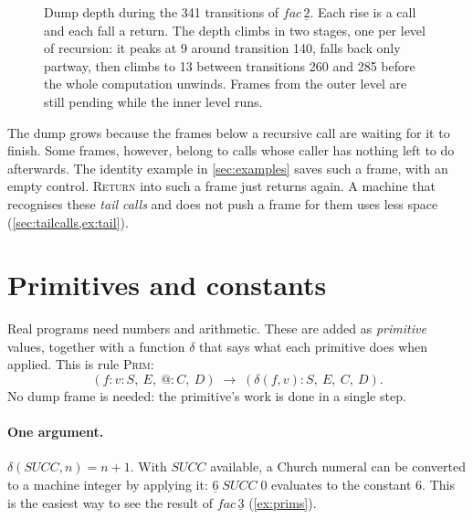 \documentclass[11pt,a4paper]{article}
\makeatletter
\newcommand{\ap}{\mathtt{@}}
\newcommand{\rul}[1]{\textsc{#1}}
\newcommand{\trans}{\;\longrightarrow\;}
\newcommand{\st}[4]{(#1,\ #2,\ #3,\ #4)}
\theoremstyle{definition}
\theoremstyle{plain}
\makeatother
\begin{document}
\begin{figure}[t]
\caption{Dump depth during the 341 transitions of $\mathit{fac}\,\underline{2}$.
Each rise is a call and each fall a return. The depth climbs in two
stages, one per level of recursion: it peaks at 9 around transition 140,
falls back only partway, then climbs to 13 between transitions 260 and 285
before the whole computation unwinds. Frames from the outer level are still
pending while the inner level runs.}
\label{fig:dump}
\end{figure}

The dump grows because the frames below a recursive call are waiting for it
to finish. Some frames, however, belong to calls whose caller has nothing left
to do afterwards. The identity example in \cref{sec:examples} saves such a frame,
with an empty control. \rul{Return} into such a frame just returns again. A
machine that recognises these \emph{tail calls} and does not push a frame
for them uses less space (\cref{sec:tailcalls,ex:tail}).

\section{Primitives and constants}\label{sec:primitives}

Real programs need numbers and arithmetic. These are added as
\emph{primitive} values, together with a function $\delta$ that says what each
primitive does when applied. This is rule \rul{Prim}:
\[
  \st{f : v : S}{E}{\ap : C}{D} \trans \st{\delta(f,v) : S}{E}{C}{D}.
\]
No dump frame is needed: the primitive's work is done in a single step.

\paragraph{One argument.} $\delta(\mathit{SUCC}, n) = n+1$. With $\mathit{SUCC}$
available, a Church numeral can be converted to a machine integer by applying
it: $\underline{6}\;\mathit{SUCC}\;0$ evaluates to the constant $6$. This is the
easiest way to see the result of $\mathit{fac}\,\underline{3}$ (\cref{ex:prims}).
\end{document}
